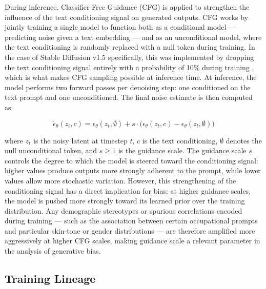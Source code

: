 During inference, Classifier-Free Guidance (CFG) \cite{Ho_2022_CFG} is 
applied to strengthen the influence of the text conditioning signal on 
generated outputs. CFG works by jointly training a single model to 
function both as a conditional model --- predicting noise given a text 
embedding --- and as an unconditional model, where the text conditioning 
is randomly replaced with a null token during training. In the case of 
Stable Diffusion v1.5 specifically, this was implemented by dropping the 
text conditioning signal entirely with a probability of 10\% during 
training \cite{StableDiffusion_2022_SD15modelcard}, which is what makes CFG sampling possible at inference time. At inference, the model performs two forward passes 
per denoising step: one conditioned on the text prompt and one 
unconditioned. The final noise estimate is then computed as:

\begin{equation}
	\tilde{\epsilon}_\theta(z_t, c) = \epsilon_\theta(z_t, \emptyset) 
	+ s \cdot \bigl(\epsilon_\theta(z_t, c) - 
	\epsilon_\theta(z_t, \emptyset)\bigr)
\end{equation}

where $z_t$ is the noisy latent at timestep $t$, $c$ is the text 
conditioning, $\emptyset$ denotes the null unconditional token, and 
$s \geq 1$ is the guidance scale. The guidance scale $s$ controls 
the degree to which the model is steered toward the conditioning 
signal: higher values produce outputs more strongly adherent to the 
prompt, while lower values allow more stochastic variation. However, 
this strengthening of the conditioning signal has a direct implication 
for bias: at higher guidance scales, the model is pushed more strongly 
toward its learned prior over the training distribution. Any demographic 
stereotypes or spurious correlations encoded during training --- such as 
the association between certain occupational prompts and particular 
skin-tone or gender distributions --- are therefore amplified more 
aggressively at higher CFG scales, making guidance scale a relevant 
parameter in the analysis of generative bias.

\subsection*{Training Lineage}

